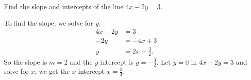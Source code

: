 


\begin{question}
	Find the slope and intercepts of the line $4x-2y=3$.
\end{question}

\begin{solution}
	To find the slope, we solve for $y$. 
	\[\begin{split}4x-2y&=3\\ -2y&=-4x+3\\ y&=2x-\frac32.\end{split}\]
	So the slope is $m=2$ and the $y$-intercept is $y=-\frac32$. 
	Let $y=0$ in $4x-2y=3$ and solve for $x$, we get the $x$-intercept $x=\frac34$.
\end{solution}